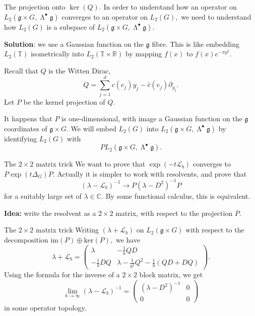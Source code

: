 \documentclass{beamer}
\numberwithin{equation}{section}
\theoremstyle{plain}
\theoremstyle{plain}
\theoremstyle{definition}
\theoremstyle{plain}
\theoremstyle{plain}
\theoremstyle{definition}
\newcommand{\Rl}{\mathbb{R}}
\newcommand{\Cplx}{\mathbb{C}}
\newcommand{\Circ}{\mathbb{T}}
\newcommand{\Lc}{\mathcal{L}}
\newcommand{\gf}{\mathfrak{g}}
\DeclareMathOperator{\Ext}{\mathsf{\Lambda}}
\begin{document}
\begin{frame}{The projection onto $\ker(Q).$}
  In order to understand how an operator on $L_2(\gf\times G,\Ext^{\bullet}\gf)$ converges to an operator on
  $L_2(G),$ we need to understand how $L_2(G)$ is a subspace of $L_2(\gf\times G,\Ext^{\bullet}\gf).$

  \textbf{Solution}: we use a Gaussian function on the $\gf$ fibre.
  This is like embedding $L_2(\Circ)$ isometrically into $L_2(\Circ\times \Rl)$ by mapping $f(x)$ to $f(x)e^{-\pi y^2}.$

  \begin{definition}
    Recall that $Q$ is the Witten Dirac,
    \[
      Q = \sum_{j=1}^d c(e_j)y_j - \widehat{c}(e_j)\partial_{y_j}.
    \]
    Let $P$ be the kernel projection of $Q.$
  \end{definition}
  It happens that $P$ is one-dimensional, with image a Gaussian function on the $\gf$ coordinates of $\gf\times G.$
  We will embed $L_2(G)$ into $L_2(\gf\times G,\Ext^{\bullet}\gf)$ by identifying $L_2(G)$ with
  \[
      PL_2(\gf\times G,\Ext^{\bullet}\gf).
  \]
\end{frame}

\begin{frame}{The $2\times 2$ matrix trick}
  We want to prove that $\exp(-t\Lc_b)$ converges to $P\exp(t\Delta_G)P.$ Actually it is simpler to work with resolvents, and prove that
  \[
    (\lambda-\Lc_b)^{-1} \rightarrow P(\lambda-D^2)^{-1}P
  \]
  for a suitably large set of $\lambda\in \Cplx.$ By some functional calculus, this is equivalent.

  \textbf{Idea:} write the resolvent as a $2\times 2$ matrix, with respect to the projection $P.$
\end{frame}

\begin{frame}{The $2\times 2$ matrix trick}
  Writing $(\lambda+\Lc_b)$ on $L_2(\gf\times G)$ with respect to the decomposition $\mathrm{im}(P)\oplus \mathrm{ker}(P),$ we have
  \[
      \lambda+\Lc_b = \begin{pmatrix} \lambda & -\frac1bQD \\ -\frac1bDQ & \lambda - \frac{1}{b^2}Q^2-\frac{1}{b}(QD+DQ)  \end{pmatrix}.
  \]
  Using the formula for the inverse of a $2\times 2$ block matrix, we get
  \[
    \lim_{b\to \infty} (\lambda-\Lc_b)^{-1} = \begin{pmatrix} (\lambda-D^2)^{-1} & 0 \\ 0 & 0\end{pmatrix}
  \]
  in some operator topology.
\end{frame}
\end{document}
